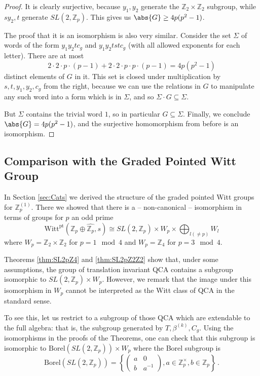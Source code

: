 \documentclass[aps,twocolumn,prx,floatfix,preprintnumbers, nofootinbib,10pt]{revtex4-2}
\numberwithin{equation}{section}
\theoremstyle{definition}
\theoremstyle{remark}
\theoremstyle{claim}
\newcommand{\be}{\begin{equation}}
\newcommand{\ee}{\end{equation}}
\newcommand{\Z}{{\mathbb Z}}
\newcommand{\Witt}{\text{Witt}}
\newcommand{\pt}{\text{pt}}
\newcommand{\curpar}[1]{\left\{ #1 \right\}}
\begin{document}
\begin{proof}
 It is clearly surjective, because $y_1, y_2$ generate the $\Z_2 \times \Z_2$ subgroup, while $s y_2, t$ generate $SL(2, \Z_p)$. This gives us $\abs{G} \geq 4 p (p^2 - 1)$.

 The proof that it is an isomorphism is also very similar. Consider the set $\Sigma$ of words of the form $y_1 y_2 t c_g$ and $y_1 y_2 t s t c_g$ (with all allowed exponents for each letter). There are at most
 \be
 2 \cdot 2 \cdot p \cdot (p-1) + 2 \cdot 2 \cdot p \cdot p \cdot (p-1) = 4p (p^2 - 1)
 \ee
 distinct elements of $G$ in it. This set is closed under multiplication by $s, t, y_1, y_2, c_g$ from the right, because we can use the relations in $G$ to manipulate any such word into a form which is in $\Sigma$, and so $\Sigma \cdot G \subseteq \Sigma$.

 But $\Sigma$ contains the trivial word $1$, so in particular $G \subseteq \Sigma$. Finally, we conclude $\abs{G} = 4 p (p^2 - 1)$, and the surjective homomorphism from before is an isomorphism.
\end{proof}

\subsection{Comparison with the Graded Pointed Witt Group}
\label{sec: Comparison with the Graded Pointed Witt Group}

In Section \ref{sec:Cats} we derived the structure of the graded pointed Witt groups for $\Z_p^{(1)}$. There we showed that there is a -- non-canonical -- isomorphism in terms of groups for $p$ an odd prime 
\be\label{WittpIso}
\Witt^\pt (\Z_p \oplus \widehat{\Z_p}, s) \cong SL(2,\Z_p) \times  W_p \times \bigoplus_{l (\neq p)} W_l
\ee
where $W_p =\Z_2\times \Z_2$ for $p=1\mod 4$ and $W_p = \Z_4$ for $p=3\mod 4$.

Theorems \ref{thm:SL2pZ4} and \ref{thm:SL2pZ2Z2} show that, under some assumptions, the group of translation invariant QCA contains a subgroup isomorphic to $SL(2,\Z_p) \times  W_p$. However, we remark that the image under this isomorphism in $W_p$ cannot be interpreted as the  Witt class {of QCA in the standard sense}.

To see this, let us restrict to a subgroup of those QCA which are extendable to the full algebra: that is, the subgroup generated by $T, \beta^{(k)}, C_g$. Using the isomorphisms in the proofs of the Theorems, one can check that this subgroup is isomorphic to $\text{Borel}(SL(2, \Z_p)) \times W_p$ where the Borel subgroup is
\be\label{eq:borel_subgroup}
\text{Borel}(SL(2, \Z_p)) = \curpar{ \begin{pmatrix} a &  0 \\ b & a^{-1}  \end{pmatrix}, a \in \Z_p^\times, b \in \Z_p } \,.
\ee
\end{document}
